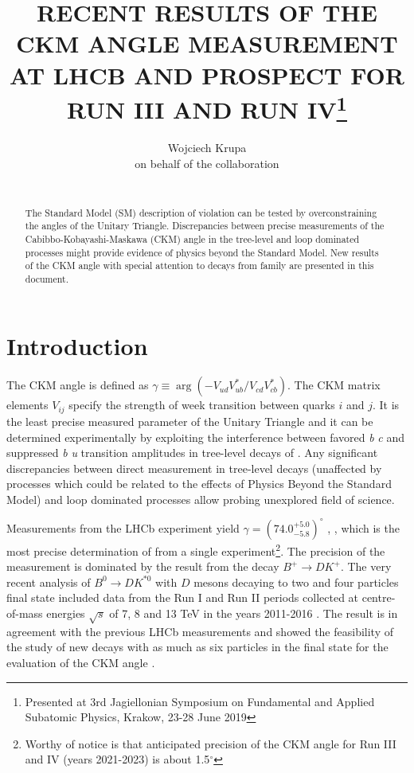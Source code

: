 \documentclass{appolb}
\begin{document}
\title{RECENT RESULTS OF THE CKM ANGLE \g MEASUREMENT AT LHCB AND PROSPECT FOR RUN III AND RUN IV\footnote{Presented at 3rd Jagiellonian Symposium on Fundamental and Applied Subatomic Physics, Krakow, 23-28 June 2019} }
\author{Wojciech Krupa \\ on behalf of the \lhcb collaboration 
\address{AGH University of Science and Technology \\Faculty of Physics and Applied Computer Science \\ al. Mickiewicza 30, 30-059 Krakow, Poland}
\\
}
\maketitle
\begin{abstract}
The Standard Model (SM) description of \CP violation can be tested by overconstraining the angles of the Unitary Triangle. Discrepancies between precise measurements of the Cabibbo-Kobayashi-Maskawa (CKM) angle \g in the tree-level and loop dominated processes might provide evidence of physics beyond the Standard Model. New results of the CKM angle \g with special attention to decays from  family are presented in this document.

\end{abstract}

\section{Introduction}
The CKM angle \g is defined as $\gamma \equiv \arg(-V_{ud}V_{ub}^{*}/V_{cd}V_{cb}^{*})$.  The CKM matrix elements $V_{ij}$ specify the strength of week transition between quarks $i$ and $j$. It is the least precise measured parameter of the Unitary Triangle and it can be determined experimentally by exploiting the interference between favored \textit{b} \to \textit{c} and suppressed \textit{b} \to \textit{u} transition amplitudes in tree-level decays of . Any significant discrepancies between direct measurement in tree-level decays (unaffected by processes which could be related to the effects of Physics Beyond the Standard Model) and loop dominated processes allow probing unexplored field of science.  

Measurements from the LHCb experiment yield $\gamma=(74.0^{+5.0}_{-5.8})^\circ$ \cite{gamma_B2DK}, \cite{gamma_comb}, which is the most precise determination of \g from a single experiment\footnote{Worthy of notice is that anticipated precision of the CKM angle \g for Run III and IV (years 2021-2023) is about 1.5$^\circ$\cite{lhcb_phys_case}}. The precision of the measurement is dominated by the result from the decay $B^+\rightarrow D K^+$. The very recent analysis of $B^0\rightarrow D K^{*0}$ with $D$ mesons decaying to two and four particles final state included data from the Run I and Run II periods collected at centre-of-mass energies $\sqrt s$ of 7, 8 and 13 TeV in the years 2011-2016 \cite{B2Dkstar0}. The result is in agreement with the previous LHCb measurements and showed the feasibility of the study of new decays with as much as six particles in the final state for the evaluation of the CKM angle \g.  
\end{document}
